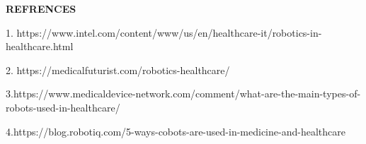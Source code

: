 \documentclass[12pt,a4paper]{report}
\begin{document}
\begin{center}
  \huge{\textbf{REFRENCES}}
\end{center}

1. https://www.intel.com/content/www/us/en/healthcare-it/robotics-in-healthcare.html\par

2. https://medicalfuturist.com/robotics-healthcare/ \par

3.https://www.medicaldevice-network.com/comment/what-are-the-main-types-of-robots-used-in-healthcare/ \par

4.https://blog.robotiq.com/5-ways-cobots-are-used-in-medicine-and-healthcare \par
\end{document}
